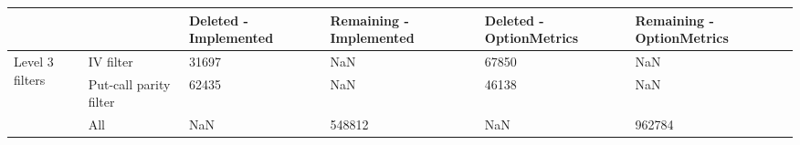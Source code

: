 \begin{tabular}{llllll}
\toprule
 &  & Deleted - Implemented & Remaining - Implemented & Deleted - OptionMetrics & Remaining - OptionMetrics \\
\midrule
\multirow[t]{3}{*}{Level 3 filters} & IV filter & 31697 & NaN & 67850 & NaN \\
 & Put-call parity filter & 62435 & NaN & 46138 & NaN \\
 & All & NaN & 548812 & NaN & 962784 \\
\cline{1-6}
\bottomrule
\end{tabular}
